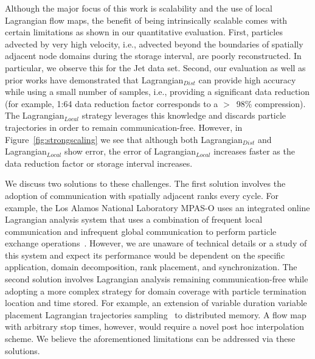 Although the major focus of this work is scalability and the use of local Lagrangian flow maps, the benefit of being intrinsically scalable comes with certain limitations as shown in our quantitative evaluation.
%
First, particles advected by very high velocity, i.e., advected beyond the boundaries of spatially adjacent node domains during the storage interval, are poorly reconstructed.
%
In particular, we observe this for the Jet data set.
%
Second, our evaluation as well as prior works have demonstrated that Lagrangian$_{Dist}$ can provide high accuracy while using a small number of samples, i.e., providing a significant data reduction (for example, 1:64 data reduction factor corresponds to a $>$~98\% compression).
%
The Lagrangian$_{Local}$ strategy leverages this knowledge and discards particle trajectories in order to remain communication-free.
%
However, in Figure~\ref{fig:strongscaling} we see that although both Lagrangian$_{Dist}$ and Lagrangian$_{Local}$ show error, the error of Lagrangian$_{Local}$ increases faster as the data reduction factor or storage interval increases.

We discuss two solutions to these challenges.
%
The first solution involves the adoption of communication with spatially adjacent ranks every cycle.
%
For example, the Los Alamos National Laboratory MPAS-O uses an integrated online Lagrangian analysis system that uses a combination of frequent local communication and infrequent global communication to perform particle exchange operations~\cite{VANSEBILLE201849}.
%
However, we are unaware of technical details or a study of this system and expect its performance would be dependent on the specific application, domain decomposition, rank placement, and synchronization.
%
The second solution involves Lagrangian analysis remaining communication-free while adopting a more complex strategy for domain coverage with particle termination location and time stored.
%
For example, an extension of variable duration variable placement Lagrangian trajectories sampling~\cite{sane2019interpolation} to distributed memory.
%
A flow map with arbitrary stop times, however, would require a novel post hoc interpolation scheme.
%
We believe the aforementioned limitations can be addressed via these solutions.

